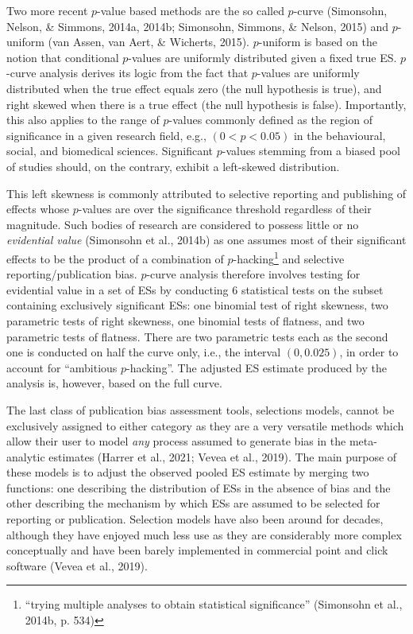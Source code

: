 \documentclass[
  man,floatsintext]{apa6}
\begin{document}
Two more recent \(p\)-value based methods are the so called \(p\)-curve (Simonsohn, Nelson, \& Simmons, 2014a, 2014b; Simonsohn, Simmons, \& Nelson, 2015) and \(p\)-uniform (van Assen, van Aert, \& Wicherts, 2015). \(p\)-uniform is based on the notion that conditional \(p\)-values are uniformly distributed given a fixed true ES. \(p\)-curve analysis derives its logic from the fact that \(p\)-values are uniformly distributed when the true effect equals zero (the null hypothesis is true), and right skewed when there is a true effect (the null hypothesis is false). Importantly, this also applies to the range of \(p\)-values commonly defined as the region of significance in a given research field, e.g., \((0 < p < 0.05)\) in the behavioural, social, and biomedical sciences. Significant \(p\)-values stemming from a biased pool of studies should, on the contrary, exhibit a left-skewed distribution.

This left skewness is commonly attributed to selective reporting and publishing of effects whose \(p\)-values are over the significance threshold regardless of their magnitude. Such bodies of research are considered to possess little or no \emph{evidential value} (Simonsohn et al., 2014b) as one assumes most of their significant effects to be the product of a combination of \(p\)-hacking\footnote{``trying multiple analyses to obtain statistical significance'' (Simonsohn et al., 2014b, p. 534)} and selective reporting/publication bias. \(p\)-curve analysis therefore involves testing for evidential value in a set of ESs by conducting 6 statistical tests on the subset containing exclusively significant ESs: one binomial test of right skewness, two parametric tests of right skewness, one binomial tests of flatness, and two parametric tests of flatness. There are two parametric tests each as the second one is conducted on half the curve only, i.e., the interval \((0,0.025)\), in order to account for ``ambitious \(p\)-hacking''. The adjusted ES estimate produced by the analysis is, however, based on the full curve.

The last class of publication bias assessment tools, selections models, cannot be exclusively assigned to either category as they are a very versatile methods which allow their user to model \emph{any} process assumed to generate bias in the meta-analytic estimates (Harrer et al., 2021; Vevea et al., 2019). The main purpose of these models is to adjust the observed pooled ES estimate by merging two functions: one describing the distribution of ESs in the absence of bias and the other describing the mechanism by which ESs are assumed to be selected for reporting or publication. Selection models have also been around for decades, although they have enjoyed much less use as they are considerably more complex conceptually and have been barely implemented in commercial point and click software (Vevea et al., 2019).
\end{document}
